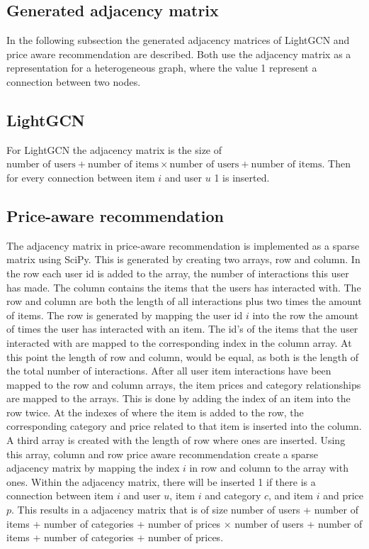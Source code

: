 \subsection{Generated adjacency matrix}
In the following subsection the generated adjacency matrices of LightGCN and price aware recommendation are described.
Both use the adjacency matrix as a representation for a heterogeneous graph, where the value 1 represent a connection between two nodes.

\subsection{LightGCN}
For LightGCN the adjacency matrix is the size of $\textrm{number of users} + \textrm{number of items} \times \textrm{number of users} + \textrm{number of items}$.
Then for every connection between item $i$ and user $u$ 1 is inserted.

\subsection{Price-aware recommendation}
The adjacency matrix in price-aware recommendation is implemented as a sparse matrix using SciPy.
This is generated by creating two arrays, row and column.
In the row each user id is added to the array, the number of interactions this user has made.
The column contains the items that the users has interacted with.
The row and column are both the length of all interactions plus two times the amount of items.
The row is generated by mapping the user id $i$ into the row the amount of times the user has interacted with an item.
The id's of the items that the user interacted with are mapped to the corresponding index in the column array.
At this point the length of row and column, would be equal, as both is the length of the total number of interactions.
After all user item interactions have been mapped to the row and column arrays, the item  prices and category relationships are mapped to the arrays.
This is done by adding the index of an item into the row twice.
At the indexes of where the item is added to the row, the corresponding category and price related to that item is inserted into the column.
A third array is created with the length of row where ones are inserted.
Using this array, column and row price aware recommendation create a sparse adjacency matrix by mapping the index $i$ in row and column to the array with ones.
Within the adjacency matrix, there will be inserted 1 if there is a connection between item $i$ and user $u$, item $i$ and category $c$, and item $i$ and price $p$.
This results in a adjacency matrix that is of size number of users + number of items + number of categories + number of prices $\times$ number of users + number of items + number of categories + number of prices.
